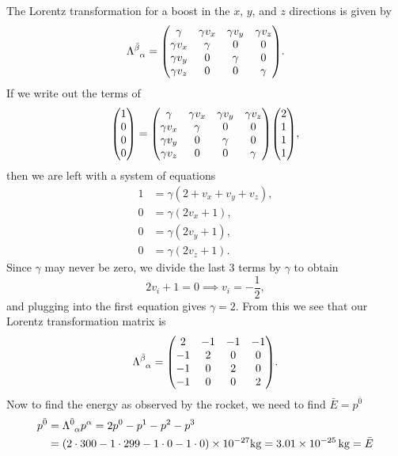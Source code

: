 \documentclass[gr-notes.tex]{subfiles}
\begin{document}
The Lorentz transformation for a boost in the $x$, $y$, and $z$ directions is given by
%
\begin{displaymath}
  \tensor{\Lambda}{^{\bar\beta}_\alpha} =
  \mqty(\gamma     & \gamma v_x & \gamma v_y & \gamma v_z \\
        \gamma v_x & \gamma     & 0          & 0          \\
        \gamma v_y & 0          & \gamma     & 0          \\
        \gamma v_z & 0          & 0          & \gamma     ).
\end{displaymath}
%
If we write out the terms of
%
\begin{displaymath}
  \mqty(1 \\ 0 \\ 0 \\ 0) =
  \mqty(\gamma     & \gamma v_x & \gamma v_y & \gamma v_z \\
        \gamma v_x & \gamma     & 0          & 0          \\
        \gamma v_y & 0          & \gamma     & 0          \\
        \gamma v_z & 0          & 0          & \gamma     )
  \mqty(2 \\ 1 \\ 1 \\ 1),
\end{displaymath}
%
then we are left with a system of equations
\begin{align*}
  1 &= \gamma (2 + v_x + v_y + v_z), \\
  0 &= \gamma (2 v_x + 1), \\
  0 &= \gamma (2 v_y + 1), \\
  0 &= \gamma (2 v_z + 1).
\end{align*}
%
Since $\gamma$ may never be zero, we divide the last 3 terms by $\gamma$ to obtain
%
\begin{displaymath}
  2 v_i + 1 = 0 \implies v_i = -\frac{1}{2},
\end{displaymath}
%
and plugging into the first equation gives $\gamma = 2$. From this we see that our Lorentz transformation matrix is
%
\begin{displaymath}
  \tensor{\Lambda}{^{\bar\beta}_\alpha} =
  \mqty( 2 & -1 & -1 & -1 \\
        -1 &  2 &  0 &  0 \\
        -1 &  0 &  2 &  0 \\
        -1 &  0 &  0 &  2).
\end{displaymath}
%
Now to find the energy as observed by the rocket, we need to find $\bar{E} = p^{\bar0}$
%
\begin{align*}
  p^{\bar0} &=
  \tensor{\Lambda}{^{\bar0}_\alpha} p^\alpha =
  2 p^0 - p^1 - p^2 - p^3
  \\ &=
  (2 \cdot 300 - 1 \cdot 299 - 1 \cdot 0 - 1 \cdot 0) \times 10^{-27} \si{kg} =
  \SI{3.01e-25}{kg} = \bar{E}
\end{align*}
\end{document}
